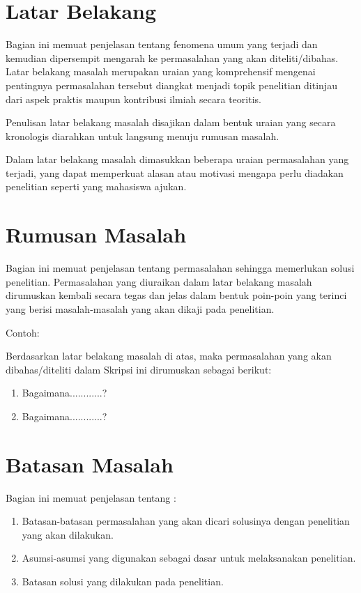 \documentclass[oneside,listof=totoc]{scrbook}
\begin{document}
\vspace{0.5cm}

\section{Latar Belakang}
Bagian ini memuat penjelasan tentang fenomena umum yang terjadi dan kemudian dipersempit mengarah ke permasalahan yang akan diteliti/dibahas. Latar belakang masalah merupakan uraian yang komprehensif mengenai pentingnya permasalahan tersebut diangkat menjadi topik penelitian ditinjau dari aspek praktis maupun kontribusi ilmiah secara teoritis.

Penulisan latar belakang masalah disajikan dalam bentuk uraian yang secara kronologis diarahkan untuk langsung menuju rumusan masalah.

Dalam latar belakang masalah dimasukkan beberapa uraian permasalahan yang terjadi, yang dapat memperkuat alasan atau motivasi mengapa perlu diadakan penelitian seperti yang mahasiswa ajukan.

\section{Rumusan Masalah}
Bagian ini memuat penjelasan tentang permasalahan sehingga memerlukan solusi penelitian. Permasalahan yang diuraikan dalam latar belakang masalah dirumuskan kembali secara tegas dan jelas dalam bentuk poin-poin yang terinci yang berisi masalah-masalah yang akan dikaji pada penelitian.

\noindent Contoh:

\noindent Berdasarkan latar belakang masalah di atas, maka permasalahan yang akan dibahas/diteliti dalam Skripsi ini dirumuskan sebagai berikut:

\begin{enumerate}[label=\alph*.]
  \item Bagaimana............?
  \item Bagaimana............?
\end{enumerate}

\section{Batasan Masalah}
Bagian ini memuat penjelasan tentang :

\begin{enumerate}[label=\alph*.]
  \item Batasan-batasan permasalahan yang akan dicari solusinya dengan penelitian yang akan dilakukan.
  \item Asumsi-asumsi yang digunakan sebagai dasar untuk melaksanakan penelitian.
  \item Batasan solusi yang dilakukan pada penelitian.
\end{enumerate}
\end{document}
